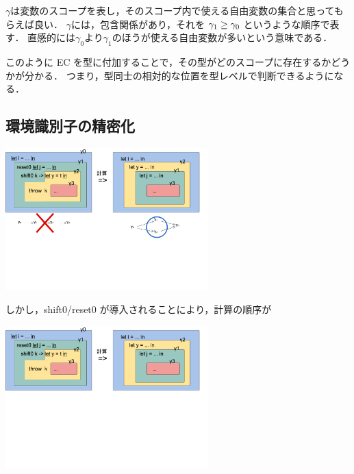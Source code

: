 $\gamma$は変数のスコープを表し，そのスコープ内で使える自由変数の集合と思ってもらえば良い．
$\gamma$には，包含関係があり，それを $\gamma_1 \ge \gamma_0$ というような順序で表す．
直感的には$\gamma_0$より$\gamma_1$のほうが使える自由変数が多いという意味である．

このように EC を型に付加することで，その型がどのスコープに存在するかどうかが分かる．
つまり，型同士の相対的な位置を型レベルで判断できるようになる．



\subsection{環境識別子の精密化}

\begin{center}
  \includegraphics[clip,height=5.5cm]{./img/ecex_let.png}
\end{center}

しかし，shift0/reset0 が導入されることにより，計算の順序が

\begin{center}
  \includegraphics[clip,height=5.5cm]{./img/ecex_let_non_gamma.png}
\end{center}


